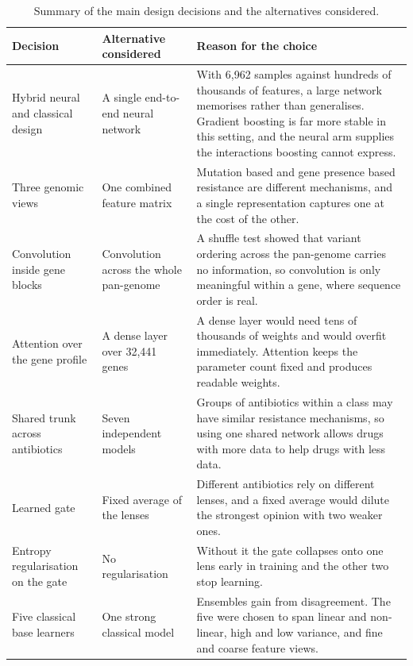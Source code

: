 \documentclass[journal]{IEEEtran}
\begin{document}
\begin{table}[!tb]
\caption{Summary of the main design decisions and the alternatives considered.}
\label{tab:designchoices}
\centering
\small
\setlength{\tabcolsep}{5pt}
\renewcommand{\arraystretch}{1.05}
\begin{tabular}{|>{\raggedright\arraybackslash}p{3.2cm}|>{\raggedright\arraybackslash}p{3.4cm}|>{\raggedright\arraybackslash}p{9.6cm}|}
\hline
\rowcolor{headgrey}
\textbf{Decision} & \textbf{Alternative considered} & \textbf{Reason for the choice} \\ \hline
Hybrid neural and classical design & A single end-to-end neural network & With 6{,}962 samples against hundreds of thousands of features, a large network memorises rather than generalises. Gradient boosting is far more stable in this setting, and the neural arm supplies the interactions boosting cannot express. \\ \hline
Three genomic views & One combined feature matrix & Mutation based and gene presence based resistance are different mechanisms, and a single representation captures one at the cost of the other. \\ \hline
Convolution inside gene blocks & Convolution across the whole pan-genome & A shuffle test showed that variant ordering across the pan-genome carries no information, so convolution is only meaningful within a gene, where sequence order is real. \\ \hline
Attention over the gene profile & A dense layer over 32{,}441 genes & A dense layer would need tens of thousands of weights and would overfit immediately. Attention keeps the parameter count fixed and produces readable weights. \\ \hline
Shared trunk across antibiotics & Seven independent models & Groups of antibiotics within a class may have similar resistance mechanisms, so using one shared network allows drugs with more data to help drugs with less data. \\ \hline
Learned gate & Fixed average of the lenses & Different antibiotics rely on different lenses, and a fixed average would dilute the strongest opinion with two weaker ones. \\ \hline
Entropy regularisation on the gate & No regularisation & Without it the gate collapses onto one lens early in training and the other two stop learning. \\ \hline
Five classical base learners & One strong classical model & Ensembles gain from disagreement. The five were chosen to span linear and non-linear, high and low variance, and fine and coarse feature views. \\ \hline

\end{tabular}
\end{table}
\end{document}
